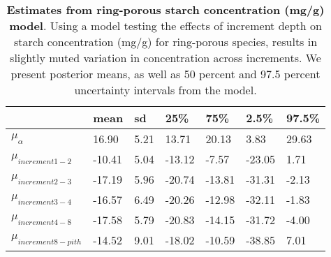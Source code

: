 \documentclass{article}\usepackage[]{graphicx}\usepackage[]{color}
\begin{document}
\begin{table}[ht]
\centering
\caption{\textbf{Estimates from ring-porous starch concentration (mg/g) model}. Using a model testing the effects of increment depth on starch concentration (mg/g) for ring-porous species, results in slightly muted variation in concentration across increments. We present posterior means, as well as 50 percent and 97.5 percent uncertainty intervals from the model.} 
\label{tab:lat}
\begingroup\footnotesize
\begin{tabular}{|p{}|p{}|p{}|p{}|p{}|p{}|p{}|}
  \hline
 & mean & sd & 25\% & 75\% & 2.5\% & 97.5\% \\ 
  \hline
$\mu_{\alpha}$ & 16.90 & 5.21 & 13.71 & 20.13 & 3.83 & 29.63 \\ 
  $\mu_{increment 1-2}$ & -10.41 & 5.04 & -13.12 & -7.57 & -23.05 & 1.71 \\ 
  $\mu_{increment 2-3}$ & -17.19 & 5.96 & -20.74 & -13.81 & -31.31 & -2.13 \\ 
  $\mu_{increment 3-4}$ & -16.57 & 6.49 & -20.26 & -12.98 & -32.11 & -1.83 \\ 
  $\mu_{increment 4-8}$ & -17.58 & 5.79 & -20.83 & -14.15 & -31.72 & -4.00 \\ 
  $\mu_{increment 8-pith}$ & -14.52 & 9.01 & -18.02 & -10.59 & -38.85 & 7.01 \\ 
   \hline
\end{tabular}
\endgroup
\end{table}
\end{document}
